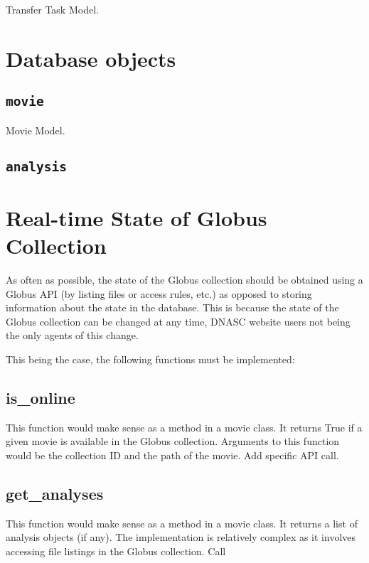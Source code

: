 \begin{table}[h] %
    
    \caption{Transfer Task Model.}
\end{table}

\section{Database objects}

\subsection{\texttt{movie}}
\begin{table}[h] %
    
    \caption{Movie Model.}
\end{table}

\subsection{\texttt{analysis}}

\section{Real-time State of Globus Collection}

As often as possible, the state of the Globus collection should be obtained using a Globus API 
(by listing files or access rules, etc.) as opposed to storing information about the state in 
the database. This is because the state of the Globus collection can be changed at any time, 
DNASC website users not being the only agents of this change.

This being the case, the following functions must be implemented:

\subsection{is\_online}

This function would make sense as a method in a movie class. It returns True if a given movie 
is available in the Globus collection. Arguments to this function would be the collection ID 
and the path of the movie. Add specific API call.

\subsection{get\_analyses}

This function would make sense as a method in a movie class. It returns a list of analysis 
objects (if any). The implementation is relatively complex as it involves accessing file 
listings in the Globus collection. Call 